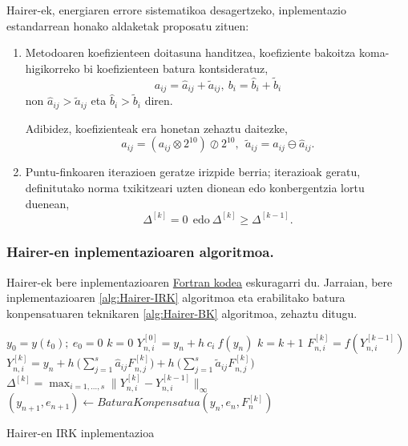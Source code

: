 Hairer-ek, energiaren errore sistematikoa desagertzeko, inplementazio estandarrean honako aldaketak proposatu zituen:
\begin{enumerate}
\item Metodoaren koefizienteen doitasuna handitzea, koefiziente bakoitza koma-higikorreko bi koefizienteen batura kontsideratuz,
\begin{equation}
\label{eq:hkoef}
a_{ij}= \hat a_{ij}+\tilde a_{ij}, \ b_i= \hat b_i+\tilde b_i
\end{equation} 
non $\hat a_{ij}>\tilde a_{ij}$ eta  $\hat b_i>\tilde b_i$ diren. 

Adibidez, koefizienteak era honetan zehaztu daitezke,
\begin{equation*}
\hat a_{ij}=(a_{ij} \otimes 2^{10}) \oslash 2^{10},\ \ \tilde a_{ij}= a_{ij}\ominus \hat a_{ij}.
\end{equation*}

\item Puntu-finkoaren iterazioen geratze irizpide berria; iterazioak geratu, definitutako norma txikitzeari uzten dionean edo konbergentzia lortu duenean,
\begin{equation}
\label{eq:hstop}
\Delta^{[k]} = 0 \ \ \text{edo} \  \Delta^{[k]} \geqslant \Delta^{[k-1]}.
\end{equation}
  	 	
\end{enumerate}

\subsubsection*{Hairer-en inplementazioaren algoritmoa.}

Hairer-ek bere inplementazioaren \href{http://www.unige.ch/~hairer/preprints.html}{Fortran kodea}  eskuragarri du. Jarraian, bere inplementazioaren \ref{alg:Hairer-IRK} algoritmoa eta erabilitako batura konpensatuaren teknikaren \ref{alg:Hairer-BK} algoritmoa, zehaztu ditugu.
 
\begin{algorithm}[h!]
 \BlankLine
  $y_0=y(t_0); \ e_0=0$\;
  {
   \BlankLine
   $k=0$\;
   $Y_{n,i}^{[0]}=y_n+h \ c_i \ f(y_n) $\; 
   \BlankLine
   {
    \BlankLine 
    $k=k+1$\;
    $F_{n,i}^{[k]}=f(Y_{n,i}^{[k-1]}) $\;
    $Y_{n,i}^{[k]}=y_n+ h \ \big(\sum\limits_{j=1}^{s} \hat a_{ij} F_{n,j}^{[k]} \big) 
                          + h \ \big(\sum\limits_{j=1}^{s} \tilde a_{ij} F_{n,j}^{[k]} \big)$\; 
    $\Delta ^{[k]} = \max_{i=1,\dots,s}\|Y_{n,i}^{[k]}-Y_{n,i}^{[k-1]}\|_{\infty}$\;
   }
   \BlankLine
   $(y_{n+1},e_{n+1})\leftarrow BaturaKonpensatua(y_n,e_n,F_n^{[k]})$\;      
   \BlankLine
 }
 \caption{Hairer-en IRK inplementazioa}
 \label{alg:Hairer-IRK}
\end{algorithm}


